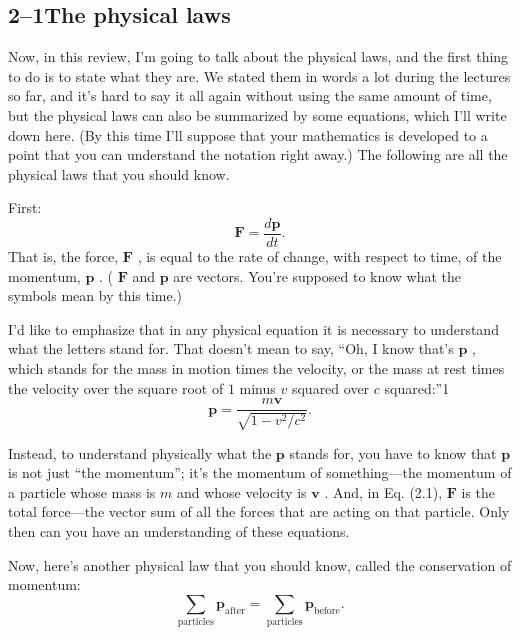 \documentclass[11pt,oneside]{article}
\providecommand{\ddt}[2]{\frac{d#1}{d#2}}
\providecommand{\FLPF}{\mathbf{F}}
\providecommand{\FLPp}{\mathbf{p}}
\providecommand{\FLPv}{\mathbf{v}}
\begin{document}
\subsection*{2--1The physical laws}

Now, in this review, I'm going to talk about the physical laws, and the first thing to do is to state what they are. We stated them in words a lot during the lectures so far, and it's hard to say it all again without using the same amount of time, but the physical laws can also be summarized by some equations, which I'll write down here. (By this time I'll suppose that your mathematics is developed to a point that you can understand the notation right away.) The following are all the physical laws that you should know.\par

First: 
\begin{equation*} \tag{2.1}
\label{Eq:TIPS:2:1} \FLPF = \ddt{\FLPp}{t}. \end{equation*}
 That is, the force, \(\FLPF\) , is equal to the rate of change, with respect to time, of the momentum, \(\FLPp\) . ( \(\FLPF\) and \(\FLPp\) are vectors. You're supposed to know what the symbols mean by this time.)\par

I'd like to emphasize that in any physical equation it is necessary to understand what the letters stand for. That doesn't mean to say, ``Oh, I know that's \(\FLPp\) , which stands for the mass in motion times the velocity, or the mass at rest times the velocity over the square root of \(1\) minus \(v\) squared over \(c\) squared:''1 
\begin{equation*} \tag{2.2}
\label{Eq:TIPS:2:2} \FLPp = \frac{m\FLPv}{\sqrt{1-{v^2}/{c^2}}}. \end{equation*}
\par

Instead, to understand physically what the \(\FLPp\) stands for, you have to know that \(\FLPp\) is not just ``the momentum''; it's the momentum of something---the momentum of a particle whose mass is \(m\) and whose velocity is \(\FLPv\) . And, in Eq. (2.1), \(\FLPF\) is the total force---the vector sum of all the forces that are acting on that particle. Only then can you have an understanding of these equations.\par

Now, here's another physical law that you should know, called the conservation of momentum: 
\begin{equation*} \tag{2.3}
\label{Eq:TIPS:2:3} \sum_\text{particles} \FLPp_\text{after} = \sum_\text{particles} \FLPp_\text{before}. \end{equation*}
\par
\end{document}

